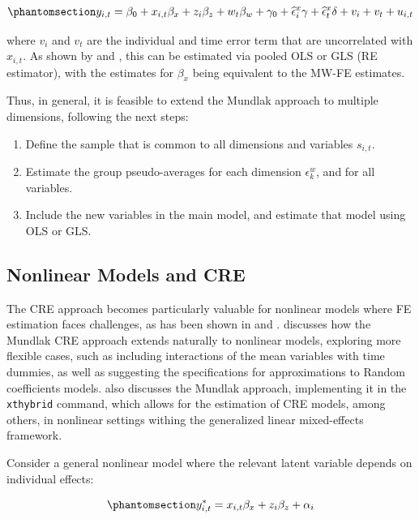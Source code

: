 \documentclass[bib]{statapress}
\providecommand{\tightlist}{%
  \setlength{\itemsep}{0pt}\setlength{\parskip}{0pt}}\usepackage{longtable,booktabs,array}
\begin{document}
\begin{equation}\phantomsection\label{eq-mcre-final}{y_{i,t} = \beta_0 + x_{i,t}\beta_x + z_{i}\beta_z + w_{t}\beta_w + \gamma_0 +\hat \epsilon^x_i\gamma +\hat\epsilon^x_t\delta+ v_i + v_t + u_{i,t}
}\end{equation}

where \(v_{i}\) and \(v_{t}\) are the individual and time error term
that are uncorrelated with \(x_{i,t}\). As shown by \citet{baltagi2024}
and \citet{yang2022}, this can be estimated via pooled OLS or GLS (RE
estimator), with the estimates for \(\beta_x\) being equivalent to the
MW-FE estimates.

Thus, in general, it is feasible to extend the Mundlak approach to
multiple dimensions, following the next steps:

\begin{enumerate}
\def\labelenumi{\arabic{enumi}.}
\tightlist
\item
  Define the sample that is common to all dimensions and variables
  \(s_{i,t}\).
\item
  Estimate the group pseudo-averages for each dimension
  \(\epsilon^w_k\), and for all variables.
\item
  Include the new variables in the main model, and estimate that model
  using OLS or GLS.
\end{enumerate}

\subsection{Nonlinear Models and CRE}\label{sec-2-2}

The CRE approach becomes particularly valuable for nonlinear models
where FE estimation faces challenges, as has been shown in
\citet{wooldridge2019} and \citet{schunck2017}. \citet{wooldridge2019}
discusses how the Mundlak CRE approach extends naturally to nonlinear
models, exploring more flexible cases, such as including interactions of
the mean variables with time dummies, as well as suggesting the
specifications for approximations to Random coefficients models.
\citet{schunck2017} also discusses the Mundlak approach, implementing it
in the \texttt{xthybrid} command, which allows for the estimation of CRE
models, among others, in nonlinear settings withing the generalized
linear mixed-effects framework.

Consider a general nonlinear model where the relevant latent variable
depends on individual effects:

\begin{equation}\phantomsection\label{eq-nl-1}{y^*_{i,t} = x_{i,t}\beta_x + z_{i}\beta_z + \alpha_i
}\end{equation}
\end{document}
